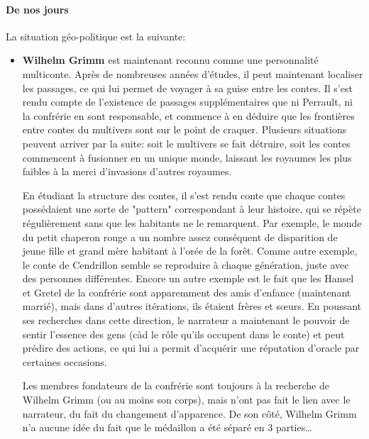 {	\paragraph{De nos jours} La situation géo-politique est la suivante:
	\begin{itemize}
		\item \textbf{Wilhelm Grimm} est maintenant reconnu comme une personnalité multiconte. Après de nombreuses années d'études, il peut maintenant localiser les passages, ce qui lui permet de voyager à sa guise entre les contes. Il s'est rendu compte de l'existence de passages supplémentaires que ni Perrault, ni la confrérie en sont responsable, et commence à en déduire que les frontières entre contes du multivers sont sur le point de craquer. Plusieurs situations peuvent arriver par la suite: soit le multivers se fait détruire, soit les contes commencent à fusionner en un unique monde, laissant les royaumes les plus faibles à la merci d'invasions d'autres royaumes.
		
		En étudiant la structure des contes, il s'est rendu conte que chaque contes possédaient une sorte de "pattern" correspondant à leur histoire, qui se répète régulièrement sans que les habitants ne le remarquent. Par exemple, le monde du petit chaperon rouge a un nombre assez conséquent de disparition de jeune fille et grand mère habitant à l'orée de la forêt. Comme autre exemple, le conte de Cendrillon semble se reproduire à chaque génération, juste avec des personnes différentes. Encore un autre exemple est le fait que les Hansel et Gretel de la confrérie sont apparemment des amis d'enfance (maintenant marrié), mais dans d'autres itérations, ils étaient frères et sœurs. En poussant ses recherches dans cette direction, le narrateur a maintenant le pouvoir de sentir l'essence des gens (càd le rôle qu'ils occupent dans le conte) et peut prédire des actions, ce qui lui a permit d'acquérir une réputation d'oracle par certaines occasions.
		
		Les membres fondateurs de la confrérie sont toujours à la recherche de Wilhelm Grimm (ou au moins son corps), mais n'ont pas fait le lien avec le narrateur, du fait du changement d'apparence. De son côté, Wilhelm Grimm n'a aucune idée du fait que le médaillon a été séparé en 3 parties\dots
		

\end{itemize}}
